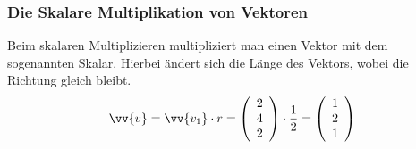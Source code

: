 \documentclass[a4paper, 15pt]{article}
\begin{document}
\subsubsection{Die Skalare Multiplikation von Vektoren}
\begin{minipage}{.49\textwidth}
Beim skalaren Multiplizieren multipliziert man einen Vektor mit dem sogenannten Skalar. Hierbei ändert sich die Länge des Vektors, wobei die Richtung gleich bleibt.
\begin{equation*}
\vv{v} = \vv{v_1} \cdot r = \left(\begin{array}{c} 2 \\ 4 \\ 2 \end{array}\right) \cdot \dfrac{1}{2} = \left(\begin{array}{c} 1 \\ 2 \\ 1 \end{array}\right)
\end{equation*}
\end{minipage}
\begin{minipage}{.49\textwidth}
\flushright
\begin{center}
\end{center}
\end{minipage}
\end{document}

